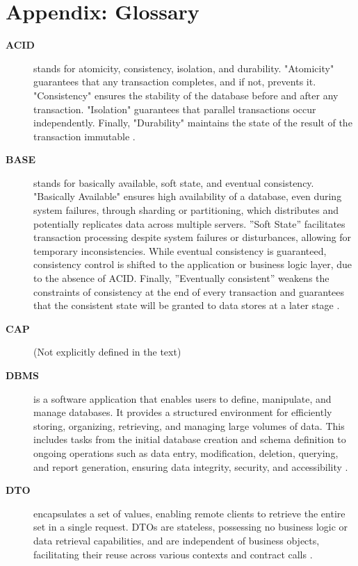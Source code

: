 \section{Appendix: Glossary}
\label{appendix:glossary}

\begin{description}

\item[\textbf{ACID}] stands for atomicity, consistency, isolation, and durability. "Atomicity" guarantees that any transaction completes, and if not, prevents it. "Consistency" ensures the stability of the database before and after any transaction. "Isolation" guarantees that parallel transactions occur independently. Finally, "Durability" maintains the state of the result of the transaction immutable \cite{jatana2012survey}.

\item[\textbf{BASE}] stands for basically available, soft state, and eventual consistency. "Basically Available" ensures high availability of a database, even during system failures, through sharding or partitioning, which distributes and potentially replicates data across multiple servers. ”Soft State” facilitates transaction processing despite system failures or disturbances, allowing for temporary inconsistencies. While eventual consistency is guaranteed, consistency control is shifted to the application or business logic layer, due to the absence of ACID. Finally, ”Eventually consistent” weakens the constraints of consistency at the end of every transaction and guarantees that the consistent state will be granted to data stores at a later stage \cite{mapanga2013database}.

\item[\textbf{CAP}] 
(Not explicitly defined in the text)

\item[\textbf{DBMS}] is a software application that enables users to define, manipulate, and manage databases. It provides a structured environment for efficiently storing, organizing, retrieving, and managing large volumes of data. This includes tasks from the initial database creation and schema definition to ongoing operations such as data entry, modification, deletion, querying, and report generation, ensuring data integrity, security, and accessibility \cite{rawat2021mysql}.

\item[\textbf{DTO}] encapsulates a set of values, enabling remote clients to retrieve the entire set in a single request. DTOs are stateless, possessing no business logic or data retrieval capabilities, and are independent of business objects, facilitating their reuse across various contexts and contract calls \cite{lee2018bridgify, pantaleev2007identifying, prakharenka2019development}.


\end{description}
